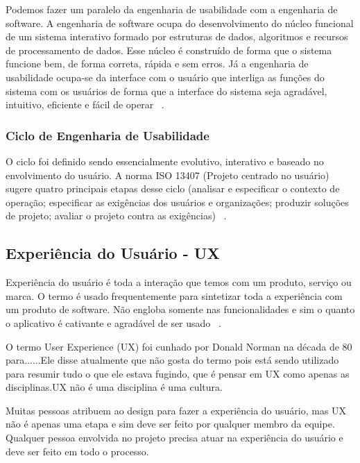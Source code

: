 Podemos fazer um paralelo da engenharia de usabilidade com a engenharia de software. A engenharia de software ocupa do desenvolvimento do núcleo funcional de um sistema interativo formado por estruturas de dados, algoritmos e recursos de processamento de dados. Esse núcleo é construído de forma que o sistema funcione bem, de forma correta, rápida e sem erros. Já a engenharia de usabilidade ocupa-se da interface com o usuário que interliga as funções do sistema com os usuários de forma que a interface do sistema seja agradável, intuitivo, eficiente e fácil de operar ~\cite{cybis2010}.



\subsubsection{Ciclo de Engenharia de Usabilidade}

	O ciclo foi definido sendo essencialmente evolutivo, interativo e baseado no envolvimento do usuário. A norma ISO 13407 (Projeto centrado no usuário) sugere quatro principais etapas desse ciclo (analisar e especificar o contexto de operação; especificar as exigências dos usuários e organizações; produzir soluções de projeto; avaliar o projeto contra as exigências) ~\cite{cybis2010}.


\subsection{Experiência do Usuário - UX}

	Experiência do usuário é toda a interação que temos com um produto, serviço ou marca. O termo é usado frequentemente para sintetizar toda a experiência com um produto de software. Não engloba  somente nas funcionalidades e sim o quanto o aplicativo é cativante e agradável de ser usado ~\cite{travis2013}.
	
	O termo User Experience (UX) foi cunhado por Donald Norman na década de 80 para......Ele disse atualmente que não gosta do termo pois está sendo utilizado para resumir tudo o que ele estava fugindo, que é pensar em UX como apenas as disciplinas.UX não é uma disciplina é uma cultura.

	Muitas pessoas atribuem ao design para fazer a experiência do usuário, mas UX não é apenas uma etapa e sim deve ser feito por qualquer membro da equipe. Qualquer pessoa envolvida no projeto precisa atuar na experiência do usuário e deve ser feito em todo o processo.
	
